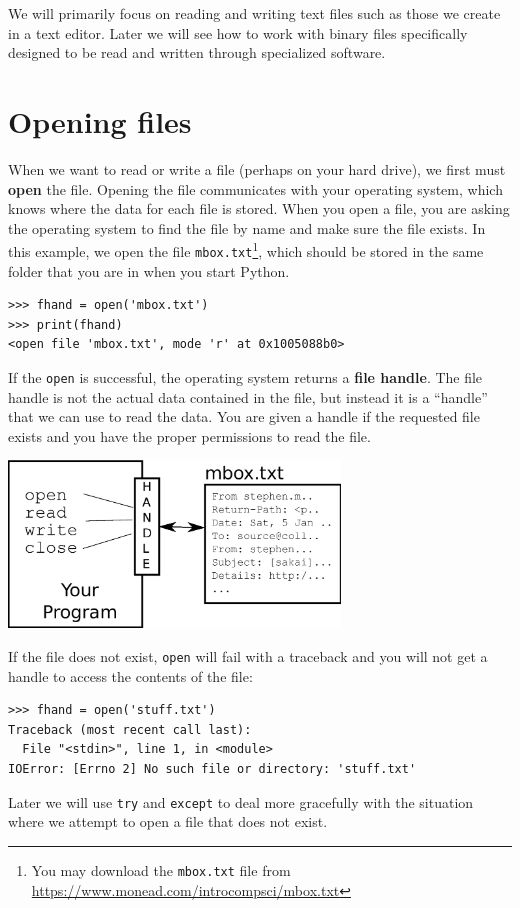 We will primarily focus on reading and writing text files such as 
those we create in a text editor.  Later we will see how to work
with binary files specifically designed to be read
and written through specialized software.

\section{Opening files}

When we want to read or write a file (perhaps on your hard drive), we first
must {\bf open} the file.  Opening the file communicates with your operating
system, which knows where the data for each file is stored.  When you open
a file, you are asking the operating system to find the file by name
and make sure the file exists.  In this example, we open the file 
{\tt mbox.txt}\footnote{You may download the \texttt{mbox.txt} file from \url{https://www.monead.com/introcompsci/mbox.txt}}, which should be stored in the same folder that you
are in when you start Python.

\beforeverb
\begin{verbatim}
>>> fhand = open('mbox.txt')
>>> print(fhand)
<open file 'mbox.txt', mode 'r' at 0x1005088b0>
\end{verbatim}
\afterverb
%
If the {\tt open} is successful, the operating system returns a 
{\bf file handle}.  The file handle is not the actual data contained
in the file, but instead it is a ``handle'' that we can use to 
read the data.   You are given a handle if the requested file
exists and you have the proper permissions to read the file.

\beforefig
\centerline{\includegraphics[height=1.75in]{figs2/handle.eps}}
\afterfig

If the file does not exist, {\tt open} will fail with a traceback and you 
will not get a handle to access the contents of the file:

\beforeverb
\begin{verbatim}
>>> fhand = open('stuff.txt')
Traceback (most recent call last):
  File "<stdin>", line 1, in <module>
IOError: [Errno 2] No such file or directory: 'stuff.txt'
\end{verbatim}
\afterverb
%
Later we will use {\tt try} and {\tt except} to deal more gracefully
with the situation where we attempt to open a file that does 
not exist.

